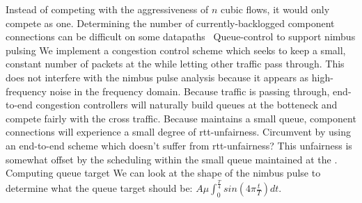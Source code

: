 \begin{outline}
            \4 Instead of competing with the aggressiveness of $n$ cubic flows, it would only compete as one.
            \4 Determining the number of currently-backlogged component connections can be difficult on some datapaths~\cite{heavy-hitters}
\1 Queue-control to support nimbus pulsing
    \2 We implement a congestion control scheme which seeks to keep a small, constant number of packets at the \inbox while letting other traffic pass through.
        \3 This does not interfere with the nimbus pulse analysis because it appears as high-frequency noise in the frequency domain.
        \3 Because traffic is passing through, end-to-end congestion controllers will naturally build queues at the botteneck and compete fairly with the cross traffic.
        \3 Because \inbox maintains a small queue, component connections will experience a small degree of rtt-unfairness.
            \4 Circumvent by using an end-to-end scheme which doesn't suffer from rtt-unfairness?
        \3 This unfairness is somewhat offset by the scheduling within the small queue maintained at the \inbox.
\1 Computing \inbox queue target
    \2 We can look at the shape of the nimbus pulse to determine what the queue target should be: $A \mu \int_0^{\frac{T}{4}} sin(4 \pi \frac{t}{T}) dt$.
\end{outline}

